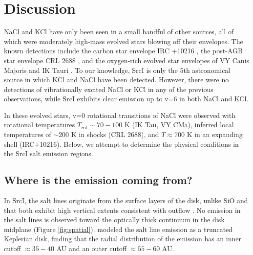 \documentclass[twocolumn]{aastex62}
\newcommand{\sourcei}{SrcI\xspace}
\begin{document}




\section{Discussion}
NaCl and KCl have only been seen in a small handful of other sources,
all of which were moderately high-mass evolved stars blowing off their envelopes.
The known detections include the carbon star envelope IRC +10216 \citep{Cernicharo1987a,Agundez2012a},
the post-AGB star envelope CRL 2688 \citep{Highberger2003a}, and the oxygen-rich
evolved star envelopes of VY Canis Majoris and IK Tauri \citep{Milam2007a}. To our knowledge, 
\sourcei is only the 5th astronomical source in which KCl and NaCl have been
detected.
However, there were no detections of vibrationally excited NaCl or KCl in any
of the previous observations,
while \sourcei exhibits clear emission up to v=6 in both NaCl and KCl.

In these evolved stars, v=0 rotational transitions of NaCl were observed
with rotational temperatures ${T_{rot}\sim70-100}$ K (IK Tau, VY CMa), inferred
local temperatures of $\sim200$ K in shocks (CRL 2688), and $T\approx700$ K  in
an expanding shell (IRC+10216).  Below, we attempt to determine the physical
conditions in the \sourcei salt emission regions.

\subsection{Where is the emission coming from?}
In \sourcei, the salt lines originate from the surface layers of the disk,
unlike SiO and \water that both exhibit high vertical
extents consistent with outflow \citep{Ginsburg2018b}.  No emission in the salt lines is observed
toward the optically thick continuum in the disk midplane (Figure \ref{fig:spatial}).
\citet{Ginsburg2018b} modeled the salt line emission as a truncated Keplerian
disk, finding that the radial distribution of the emission has an inner cutoff
$\approx35-40$ AU and an outer cutoff $\approx55-60$ AU.
\end{document}
